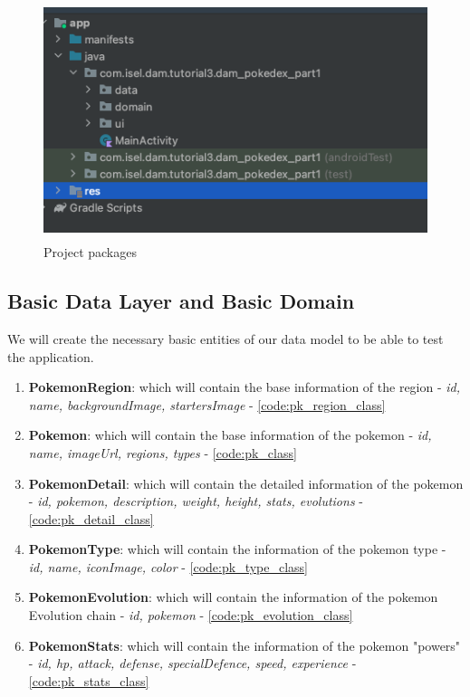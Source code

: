 \documentclass[a4paper, 12pt]{article}
\begin{document}
\begin{figure}[h]
	\centering
	\includegraphics[height=7cm]{imgs/project/project_packges.png}
	\caption{Project packages}
	\label{fig:pj_packges}
\end{figure}




\subsection{Basic Data Layer and Basic Domain}

We will create the necessary basic entities of our data model to be able to test the application.

\begin{enumerate}
    \item \textbf{PokemonRegion}:  which will contain the base information of the region - \textit{id, name, backgroundImage, startersImage} - \ref{code:pk_region_class}
    \item \textbf{Pokemon}: which will contain the base information of the pokemon - \textit{id, name, imageUrl, regions, types} - \ref{code:pk_class}
    \item \textbf{PokemonDetail}: which will contain the detailed information of the pokemon - \textit{id, pokemon, description, weight, height, stats, evolutions} - \ref{code:pk_detail_class}
    \item \textbf{PokemonType}: which will contain the information of the pokemon type - \textit{id, name, iconImage, color} - \ref{code:pk_type_class}
    \item \textbf{PokemonEvolution}: which will contain the information of the pokemon Evolution chain - \textit{id, pokemon} - \ref{code:pk_evolution_class}
    \item \textbf{PokemonStats}: which will contain the information of the pokemon "powers" - \textit{id, hp, attack, defense, specialDefence, speed, experience} - \ref{code:pk_stats_class}
\end{enumerate}
\end{document}
